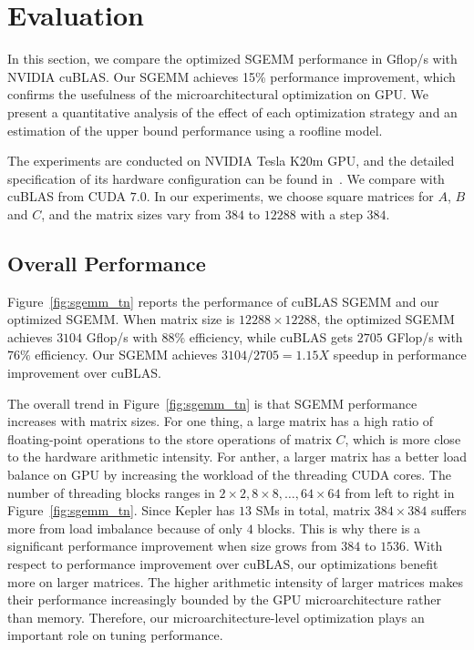 \section{Evaluation}
\label{sec:experiment}


In this section, we compare the optimized SGEMM performance in Gflop/s with NVIDIA cuBLAS. 
Our SGEMM achieves 15\% %
performance
improvement, which confirms the usefulness of the microarchitectural optimization on GPU. 
We present 
a quantitative analysis of the effect of each optimization strategy and an estimation of the upper bound performance using a roofline model.

The experiments are conducted on NVIDIA Tesla K20m GPU, and the detailed specification of its hardware configuration can be found in~\cite{}. We compare with cuBLAS from CUDA $7.0$. In our experiments, we choose square matrices for $A$, $B$
and $C$, and  the matrix sizes vary from $384$ to $12288$ with a step $384$.

\subsection{Overall Performance}
Figure~\ref{fig:sgemm_tn} reports the performance of cuBLAS SGEMM and our optimized SGEMM.
When matrix size is $12288\times12288$, the optimized SGEMM achieves $3104$
Gflop/s with $88\%$ efficiency, while cuBLAS gets $2705$ GFlop/s with $76\%$ efficiency.
Our SGEMM achieves $3104/2705=1.15X$ speedup in performance improvement over cuBLAS.%

The overall trend in Figure~\ref{fig:sgemm_tn} is that SGEMM performance increases with matrix sizes. 
For one thing, a large matrix has a high ratio of 
floating-point operations to the store operations of matrix $C$, which is more close to the hardware arithmetic intensity. 
For anther, a larger matrix has a better load balance on GPU by increasing the workload of the threading CUDA
cores.
The number of threading blocks ranges in $2 \times 2, 8 \times 8, \dots, 64 \times 64$ from left to right in Figure~\ref{fig:sgemm_tn}.
Since Kepler has $13$ SMs in total, matrix $384\times 384$ suffers more from load imbalance because of only $4$ blocks.
This is why there is a significant performance improvement when size grows from $384$ to $1536$. 
With respect to performance improvement over cuBLAS, our optimizations benefit more on larger matrices. 
The higher arithmetic intensity of larger matrices makes their performance increasingly bounded by the GPU microarchitecture rather than memory. 
Therefore, our microarchitecture-level optimization plays an important role on tuning 
performance.

